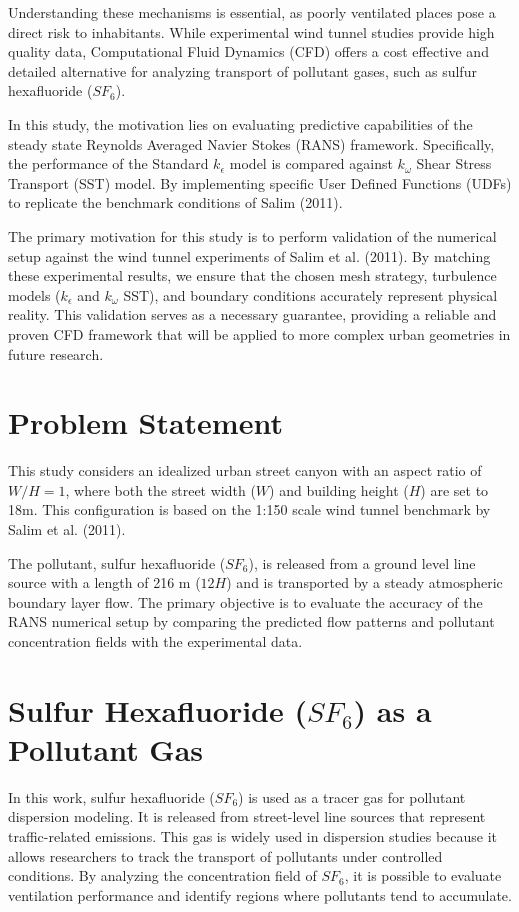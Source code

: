 \documentclass[11pt,a4paper]{report}
\begin{document}
Understanding these mechanisms is essential, as poorly ventilated places pose a direct risk to inhabitants. While experimental wind tunnel studies provide high quality data, Computational Fluid Dynamics (CFD) offers a cost effective and detailed alternative for analyzing transport of pollutant gases, such as sulfur hexafluoride ($SF_6$).

In this study, the motivation lies on evaluating predictive capabilities of the steady state Reynolds Averaged Navier Stokes (RANS) framework. Specifically, the performance of the Standard $k_\epsilon$ model is compared against $k_\omega$ Shear Stress Transport (SST) model. By implementing specific User Defined Functions (UDFs) to replicate the benchmark conditions of Salim (2011).

The primary motivation for this study is to perform validation of the numerical setup against the wind tunnel experiments of Salim et al. (2011). By matching these experimental results, we ensure that the chosen mesh strategy, turbulence models ($k_\epsilon$ and $k_\omega$ SST), and boundary conditions accurately represent physical reality. This validation serves as a necessary guarantee, providing a reliable and proven CFD framework that will be applied to more complex urban geometries in future research.

\section{Problem Statement}
This study considers an idealized urban street canyon with an aspect ratio of $W/H = 1$, where both the street width ($W$) and building height ($H$) are set to 18m. This configuration is based on the 1:150 scale wind tunnel benchmark by Salim et al. (2011).

The pollutant, sulfur hexafluoride ($SF_6$), is released from a ground level line source with a length of 216 m ($12H$) and is transported by a steady atmospheric boundary layer flow. The primary objective is to evaluate the accuracy of the RANS numerical setup by comparing the predicted flow patterns and pollutant concentration fields with the experimental data.

\section{Sulfur Hexafluoride ($SF_6$) as a Pollutant Gas}
In this work, sulfur hexafluoride ($SF_6$) is used as a tracer gas for pollutant dispersion modeling. It is released from street-level line sources that represent traffic-related emissions. This gas is widely used in dispersion studies because it allows researchers to track the transport of pollutants under controlled conditions. By analyzing the concentration field of $SF_6$, it is possible to evaluate ventilation performance and identify regions where pollutants tend to accumulate.
\end{document}
